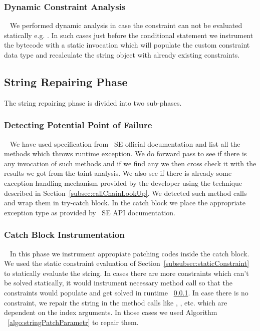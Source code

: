 \subsubsection{Dynamic Constraint Analysis}
\label{subsubsec:dynamicConstraint}
~\newline
We performed dynamic analysis in case the constraint can not be evaluated 
statically e.g. . In such cases just
before the conditional statement we instrument the bytecode with a static 
invocation which will populate the custom constraint data type and recalculate 
the string object with already existing constraints.


\subsection{String Repairing Phase}
\label{subsec:stringReepairing}

The string repairing phase is divided into two sub-phases.

\subsubsection{Detecting Potential Point of Failure}
\label{subsub:detectingFailure}
~\newline
We have used specification from \java\ SE official documentation and list all
the methods which throws runtime exception. We do forward pass to see if there 
is any invocation of such methods and if we find any we then cross check it 
with the results we got from the taint analysis. We also see if there is already
some exception handling mechanism provided by the developer using the technique 
described in Section~\ref{subsec:callChainLookUp}. We detected such method calls
and wrap them in try-catch block. In the catch block we place the appropriate
exception type as provided by \java\ SE API documentation. 

\subsubsection{Catch Block Instrumentation}
\label{subsub:catchInstrumentation}
~\newline
In this phase we instrument appropiate patching codes inside the catch block.
We used the static constraint evaluation of
Section~\ref{subsubsec:staticConstraint} to statically evaluate the string. In
cases there are more constraints which can't be solved statically, it would instrument
necessary method call so that the constraints would populate and get solved in runtime
~\ref{subsubsec:dynamicConstraint}. In case there is no constraint, we repair the
string in the method calls like , ,  etc.
which are dependent on the index arguments. In those cases we used Algorithm
~\ref{algo:stringPatchParametr} to repair them.


